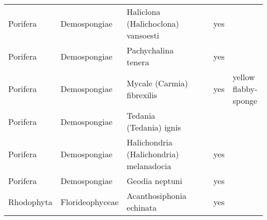 \begin{longtable}{lllllll}
  Porifera & Demospongiae & Haliclona (Halichoclona) vansoesti &  &  & yes &  \\ 
  Porifera & Demospongiae & Pachychalina tenera &  &  & yes &  \\ 
  Porifera & Demospongiae & Mycale (Carmia) fibrexilis &  &  & yes & yellow flabby-sponge \\ 
  Porifera & Demospongiae & Tedania (Tedania) ignis &  &  &  &  \\ 
  Porifera & Demospongiae & Halichondria (Halichondria) melanadocia &  &  & yes &  \\ 
  Porifera & Demospongiae & Geodia neptuni &  &  & yes &  \\ 
  Rhodophyta & Florideophyceae & Acanthosiphonia echinata &  &  & yes &  \\ 
  \hline
\end{longtable}
\endgroup
